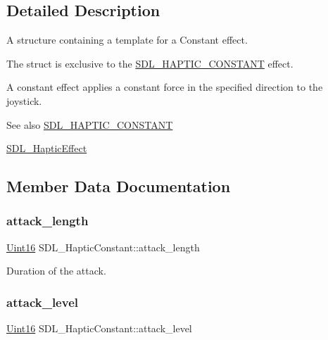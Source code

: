 \subsection{Detailed Description}
A structure containing a template for a Constant effect. 

The struct is exclusive to the \hyperlink{_s_d_l__haptic_8h_a955fb9f680dcf9cc72a3d5263e85b80a}{S\+D\+L\+\_\+\+H\+A\+P\+T\+I\+C\+\_\+\+C\+O\+N\+S\+T\+A\+NT} effect.

A constant effect applies a constant force in the specified direction to the joystick.

\begin{DoxySeeAlso}{See also}
\hyperlink{_s_d_l__haptic_8h_a955fb9f680dcf9cc72a3d5263e85b80a}{S\+D\+L\+\_\+\+H\+A\+P\+T\+I\+C\+\_\+\+C\+O\+N\+S\+T\+A\+NT} 

\hyperlink{union_s_d_l___haptic_effect}{S\+D\+L\+\_\+\+Haptic\+Effect} 
\end{DoxySeeAlso}


\subsection{Member Data Documentation}
\mbox{\label{struct_s_d_l___haptic_constant_a907bade68ab53fb24e7d2651d19b767f}} 
\subsubsection{\texorpdfstring{attack\+\_\+length}{attack\_length}}
{\footnotesize\ttfamily \hyperlink{_s_d_l__stdinc_8h_a31fcc0a076c9068668173ee26d33e42b}{Uint16} S\+D\+L\+\_\+\+Haptic\+Constant\+::attack\+\_\+length}

Duration of the attack. \mbox{\label{struct_s_d_l___haptic_constant_a0928a37f3fab0e5b7daffc7a1d65744c}} 
\subsubsection{\texorpdfstring{attack\+\_\+level}{attack\_level}}
{\footnotesize\ttfamily \hyperlink{_s_d_l__stdinc_8h_a31fcc0a076c9068668173ee26d33e42b}{Uint16} S\+D\+L\+\_\+\+Haptic\+Constant\+::attack\+\_\+level}


